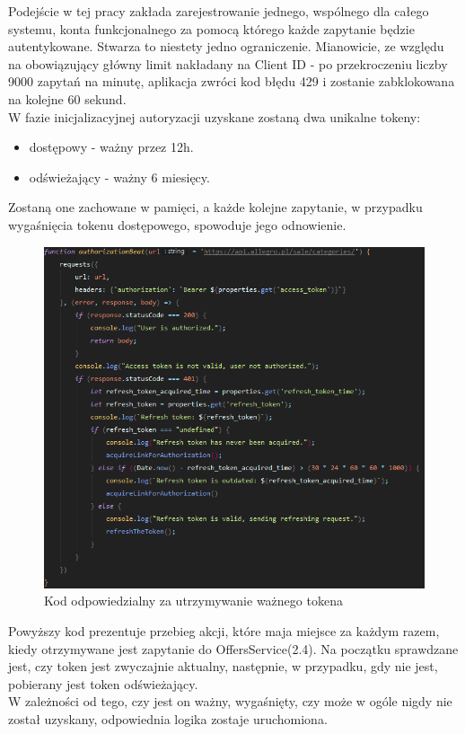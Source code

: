 Podejście w tej pracy zakłada zarejestrowanie jednego, wspólnego dla całego systemu, konta funkcjonalnego za pomocą którego każde zapytanie będzie autentykowane. Stwarza to niestety jedno ograniczenie. Mianowicie, ze względu na obowiązujący główny limit nakładany na Client ID  - po przekroczeniu liczby 9000 zapytań na minutę, aplikacja zwróci kod błędu 429 i zostanie zabklokowana na kolejne 60 sekund.\\
W fazie inicjalizacyjnej autoryzacji uzyskane zostaną dwa unikalne tokeny: 
\begin{itemize}
	\item dostępowy - ważny przez 12h.
	\item odświeżający - ważny 6 miesięcy.
\end{itemize}
Zostaną one zachowane w pamięci, a każde kolejne zapytanie, w przypadku wygaśnięcia tokenu dostępowego, spowoduje jego odnowienie.
\begin{figure}[H]
	\centering
	\includegraphics[width=\linewidth]{authorization.png}
	\caption{Kod odpowiedzialny za utrzymywanie ważnego tokena}
\end{figure}
Powyższy kod prezentuje przebieg akcji, które maja miejsce za każdym razem, kiedy otrzymywane jest zapytanie do OffersService(2.4). Na początku sprawdzane jest, czy token jest zwyczajnie aktualny, następnie, w przypadku, gdy nie jest, pobierany jest token odświeżający. \\W zależności od tego, czy jest on ważny, wygaśnięty, czy może w ogóle nigdy nie został uzyskany, odpowiednia logika zostaje uruchomiona.

